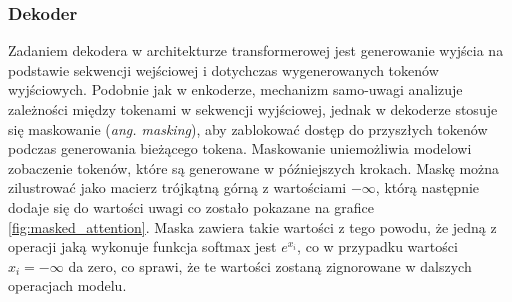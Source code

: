 \documentclass[data-science]{agh-wi} %
\begin{document}
\subsubsection*{Dekoder}
Zadaniem dekodera w architekturze transformerowej jest generowanie wyjścia na podstawie sekwencji wejściowej i dotychczas wygenerowanych tokenów wyjściowych. Podobnie jak w enkoderze, mechanizm samo-uwagi analizuje zależności między tokenami w sekwencji wyjściowej, jednak w dekoderze stosuje się maskowanie (\textit{ang. masking}), aby zablokować dostęp do przyszłych tokenów podczas generowania bieżącego tokena. Maskowanie uniemożliwia modelowi zobaczenie tokenów, które są generowane w późniejszych krokach. Maskę można zilustrować jako macierz trójkątną górną z wartościami $-\infty$, którą następnie dodaje się do wartości uwagi co zostało pokazane na grafice \ref*{fig:masked_attention}. Maska zawiera takie wartości z tego powodu, że jedną z operacji jaką wykonuje funkcja softmax jest $e^{x_i}$, co w przypadku wartości $x_i = -\infty$ da zero, co sprawi, że te wartości zostaną zignorowane w dalszych operacjach modelu.
\end{document}
